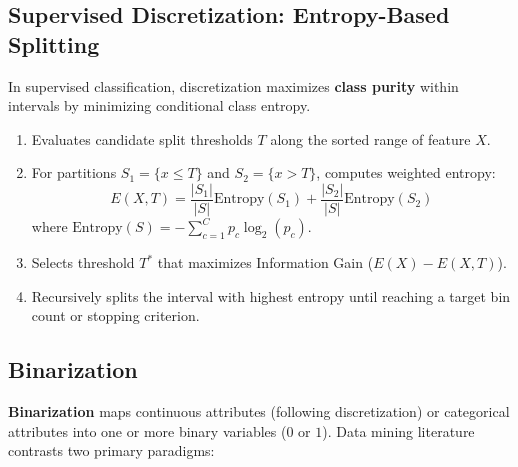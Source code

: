 \subsection{Supervised Discretization: Entropy-Based Splitting}
In supervised classification, discretization maximizes \textbf{class purity} within intervals by minimizing conditional class entropy.
\begin{enumerate}
    \item Evaluates candidate split thresholds $T$ along the sorted range of feature $X$.
    \item For partitions $S_1 = \{x \le T\}$ and $S_2 = \{x > T\}$, computes weighted entropy:
    \begin{equation}
    E(X, T) = \frac{|S_1|}{|S|} \text{Entropy}(S_1) + \frac{|S_2|}{|S|} \text{Entropy}(S_2)
    \end{equation}
    where $\text{Entropy}(S) = -\sum_{c=1}^C p_c \log_2(p_c)$.
    \item Selects threshold $T^*$ that maximizes Information Gain ($E(X) - E(X, T)$).
    \item Recursively splits the interval with highest entropy until reaching a target bin count or stopping criterion.
\end{enumerate}

\subsection{Binarization}
\textbf{Binarization} maps continuous attributes (following discretization) or categorical attributes into one or more binary variables ($0$ or $1$). Data mining literature contrasts two primary paradigms:

